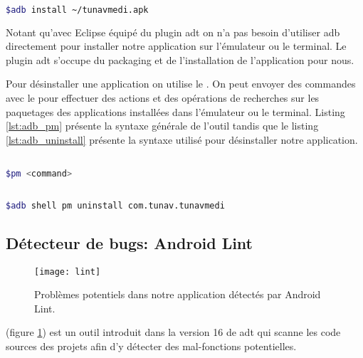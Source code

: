 \begin{lstlisting}[language=bash, label=lst:adb_install, caption=Exemple d'utilisation du commande adb install]

$adb install ~/tunavmedi.apk

\end{lstlisting}

Notant qu'avec Eclipse équipé du plugin \gls{adt} on n'a pas besoin d'utiliser
\gls{adb} directement pour installer notre application sur l'émulateur ou le
terminal. Le plugin \gls{adt} s'occupe du packaging et de l'installation de
l'application pour nous.


Pour désinstaller une application on utilise le . On peut
envoyer des commandes avec le  pour effectuer des actions et
des opérations de recherches sur les paquetages des applications installées dans
l'émulateur ou le terminal. Listing \ref{lst:adb_pm} présente la syntaxe
générale de l'outil tandis que le listing \ref{lst:adb_uninstall} présente la
syntaxe utilisé pour désinstaller notre application.


\begin{lstlisting}[language=bash, label=lst:adb_pm, caption=Syntaxe générale de l'utilisation du Package Manager]

$pm <command>

\end{lstlisting}

\begin{lstlisting}[language=bash, label=lst:adb_uninstall, caption=Exemple de désinstallation]

$adb shell pm uninstall com.tunav.tunavmedi

\end{lstlisting}

\subsection{Détecteur de bugs: Android Lint}

\begin{figure}[H]
\center
\texttt{[image: lint]}
\caption{Problèmes potentiels dans notre application détectés par Android Lint.}
\label{fig:lint}
\end{figure}

\android{}  (figure \ref{fig:lint}) est un outil introduit dans la version 16 de \gls{adt} qui scanne les code sources des projets \android{} afin d'y détecter des mal-fonctions potentielles.

